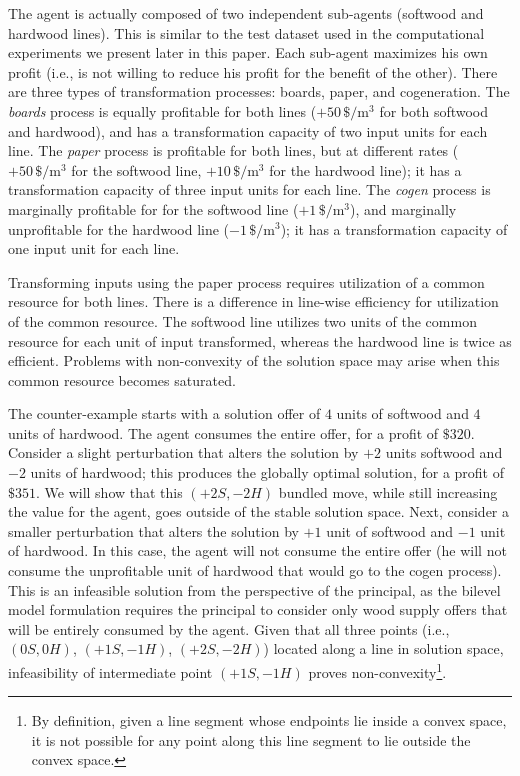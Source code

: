 The agent is actually composed of two independent sub-agents (softwood and hardwood lines). 
This is similar to the test dataset used in the computational experiments we present later in this paper.
Each sub-agent maximizes his own profit (i.e., is not willing to reduce his profit for the benefit of the other).
There are three types of transformation processes: boards, paper, and cogeneration.
The \emph{boards} process is equally profitable for both lines ($+50\,\si{\$\per\cubic\metre}$ for both softwood and hardwood), and has a transformation capacity of two input units for each line.
The \emph{paper} process is profitable for both lines, but at different rates ($+50\,\si{\$\per\cubic\metre}$ for the softwood line, $+10\,\si{\$\per\cubic\metre}$ for the hardwood line); it has a transformation capacity of three input units for each line.
The \emph{cogen} process is marginally profitable for for the softwood line ($+1\,\si{\$\per\cubic\metre}$), and marginally unprofitable for the hardwood line ($-1\,\si{\$\per\cubic\metre}$); it has a transformation capacity of one input unit for each line.

Transforming inputs using the paper process requires utilization of a common resource for both lines.
There is a difference in line-wise efficiency for utilization of the common resource.
The softwood line utilizes two units of the common resource for each unit of input transformed, whereas the hardwood line is twice as efficient.
Problems with non-convexity of the solution space may arise when this common resource becomes saturated.

The counter-example starts with a solution offer of $4$ units of softwood and $4$ units of hardwood.
The agent consumes the entire offer, for a profit of $\$320$. 
Consider a slight perturbation that alters the solution by $+2$ units softwood and $-2$ units of hardwood; this produces the globally optimal solution, for a profit of $\$351$. 
We will show that this $(+2S,-2H)$ bundled move, while still increasing the value for the agent, goes outside of the stable solution space.
Next, consider a smaller perturbation that alters the solution by $+1$ unit of softwood and $-1$ unit of hardwood.
In this case, the agent will not consume the entire offer (he will not consume the unprofitable unit of hardwood that would go to the cogen process).
This is an infeasible solution from the perspective of the principal, as the bilevel model formulation requires the principal to consider only wood supply offers that will be entirely consumed by the agent. Given that all three points (i.e., $(0S, 0H)$, $(+1S, -1H)$, $(+2S, -2H)$) located along a line in solution space, infeasibility of intermediate point $(+1S, -1H)$ proves non-convexity\footnote{By definition, given a line segment whose endpoints lie inside a convex space, it is not possible for any point along this line segment to lie outside the convex space. }.

